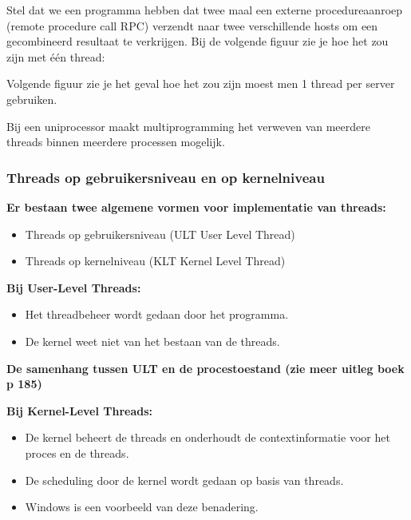 Stel dat we een programma hebben dat twee maal een externe procedureaanroep (remote procedure call RPC) verzendt naar twee verschillende hosts om een gecombineerd resultaat te verkrijgen. Bij de volgende figuur zie je hoe het zou zijn met één thread:








Volgende figuur zie je het geval hoe het zou zijn moest men 1 thread per server gebruiken.










Bij een uniprocessor maakt multiprogramming het verweven van meerdere threads binnen meerdere processen mogelijk.

\subsubsection{Threads op gebruikersniveau en op kernelniveau}

\textbf{Er bestaan twee algemene vormen voor implementatie van threads:}

\begin{itemize}
\item Threads op gebruikersniveau (ULT User Level Thread)
\item Threads op kernelniveau (KLT Kernel Level Thread)
\end{itemize}

\textbf{Bij User-Level Threads:}

\begin{itemize}
        \item Het threadbeheer wordt gedaan door het programma.
        \item De kernel weet niet van het bestaan van de threads.
\end{itemize}

\textbf{De samenhang tussen ULT en de procestoestand (zie meer uitleg boek p 185)}











\textbf{Bij Kernel-Level Threads:}

\begin{itemize}
    \item De kernel beheert de threads en onderhoudt de contextinformatie voor het proces en de threads.
    \item De scheduling door de kernel wordt gedaan op basis van threads.
        
    \item Windows is een voorbeeld van deze benadering.
\end{itemize}
	
